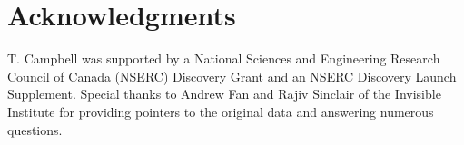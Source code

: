 \documentclass{article}
\begin{document}


\section*{Acknowledgments}
T. Campbell was supported by a National Sciences and Engineering Research Council of Canada (NSERC) Discovery Grant and an NSERC Discovery Launch Supplement.
Special thanks to Andrew Fan and Rajiv Sinclair of the Invisible Institute for providing pointers to the original data and answering numerous questions.






\appendix






\end{document}

